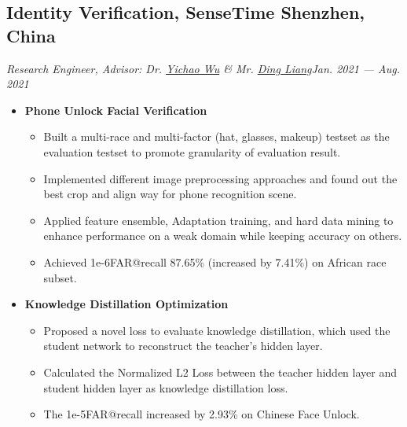 \documentclass[a4,10pt]{article}
\newcommand{\subtext}[1]{
#1\par\vspace{-0.2cm}}
\newenvironment{zitemize}{
\begin{itemize}\itemsep0pt \parskip0pt \parsep1pt}
{\end{itemize}\vspace{-0.5cm}}
\begin{document}
\subsection*{Identity Verification, SenseTime \hfill Shenzhen, China} 
\subtext{\textit{Research Engineer, Advisor: Dr. \href{https://scholar.google.com/citations?user=20Its9kAAAAJ&hl=en} {Yichao Wu} \& Mr. \href{https://scholar.google.com/citations?user=Dqjnn0gAAAAJ&hl=zh-CN}{Ding Liang}}\hfill \textit{Jan. 2021 --- Aug. 2021}}
    \begin{zitemize}
        \item \textbf{Phone Unlock Facial Verification}
            \begin{itemize} 
                \item Built a multi-race and multi-factor (hat, glasses, makeup) testset as the evaluation testset to promote granularity of evaluation result.
                \item Implemented different image preprocessing approaches and found out the best crop and align way for phone recognition scene.
                \item Applied feature ensemble, Adaptation training, and hard data mining to enhance performance on a weak domain while keeping accuracy on others. 
                \item Achieved 1e-6FAR@recall 87.65\% (increased by 7.41\%) on African race subset.

            \end{itemize}
        \item \textbf{Knowledge Distillation Optimization}
            \begin{itemize} 
                \item Proposed a novel loss to evaluate knowledge distillation, which used the student network to reconstruct the teacher's hidden layer. 
                \item Calculated the Normalized L2 Loss between the teacher hidden layer and student hidden layer as knowledge distillation loss. 
                \item The 1e-5FAR@recall increased by 2.93\% on Chinese Face Unlock.
            \end{itemize}
    \end{zitemize}
\end{document}
